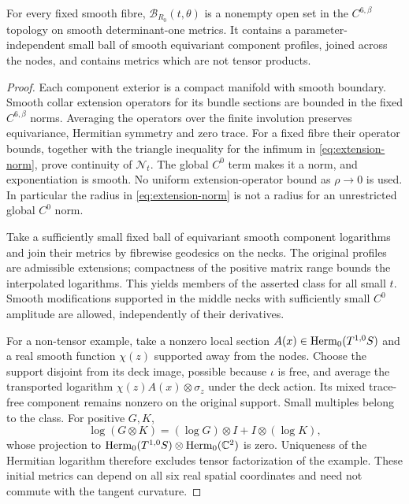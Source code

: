 \begin{lemma}\label{lem:open-class}
For every fixed smooth fibre, $\mathcal B_{R_0}(t,\theta)$ is a
nonempty open set in the $C^{6,\beta}$ topology on smooth
determinant-one metrics. It contains a parameter-independent small
ball of smooth equivariant component profiles, joined across the
nodes, and contains metrics which are not tensor products.
\end{lemma}
\begin{proof}
Each component exterior is a compact manifold with smooth boundary.
Smooth collar extension operators for its bundle sections are bounded
in the fixed $C^{6,\beta}$ norms. Averaging the operators over the
finite involution preserves equivariance, Hermitian symmetry and zero
trace. For a fixed fibre their operator bounds, together with the
triangle inequality for the infimum in \eqref{eq:extension-norm},
prove continuity of $\mathcal N_t$. The global $C^0$ term makes it
a norm, and exponentiation is smooth. No uniform extension-operator
bound as $\rho\to0$ is used. In particular the radius in
\eqref{eq:extension-norm} is not a radius for an unrestricted global
$C^0$ norm.

Take a sufficiently small fixed ball of equivariant smooth component
logarithms and join their metrics by fibrewise geodesics on the necks.
The original profiles are admissible extensions; compactness of the
positive matrix range bounds the interpolated logarithms. This yields
members of the asserted class for all small $t$. Smooth modifications
supported in the middle necks with sufficiently small $C^0$ amplitude
are allowed, independently of their derivatives.

For a non-tensor example, take a nonzero local section
$A(x)\in\operatorname{Herm}_0(T^{1,0}S)$ and a real smooth function $\chi(z)$
supported away from the nodes. Choose the support disjoint from its
deck image, possible because $\iota$ is free, and average the
transported logarithm $\chi(z)A(x)\otimes\sigma_z$ under the deck
action. Its mixed trace-free component remains nonzero on the original
support. Small multiples belong to the class. For positive $G,K$,
\[
 \log(G\otimes K)=(\log G)\otimes I+I\otimes(\log K),
\]
whose projection to
$\operatorname{Herm}_0(T^{1,0}S)\otimes\operatorname{Herm}_0(\mathbb C^2)$ is zero. Uniqueness of
the Hermitian logarithm therefore excludes tensor factorization of
the example. These initial metrics can depend on all six real spatial
coordinates and need not commute with the tangent curvature.
\end{proof}

